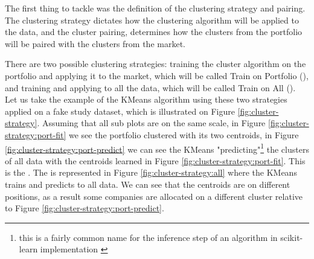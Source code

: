 The first thing to tackle was the definition of the clustering strategy and pairing. The clustering strategy dictates how the clustering algorithm will be applied to the data, and the cluster pairing, determines how the clusters from the portfolio will be paired with the clusters from the market.

There are two possible clustering strategies: training the cluster algorithm on the portfolio and applying it to the market, which will be called Train on Portfolio (\nameClusterStrategyA{}), and training and applying to all the data, which will be called Train on All (\nameClusterStrategyB{}). Let us take the example of the KMeans algorithm using these two strategies applied on a fake study dataset, which is illustrated on Figure \ref{fig:cluster-strategy}. Assuming that all sub plots are on the same scale, in Figure \ref{fig:cluster-strategy:port-fit} we see the portfolio clustered with its two centroids, in Figure \ref{fig:cluster-strategy:port-predict} we can see the KMeans "predicting"\footnote{this is a fairly common name for the inference step of an algorithm in scikit-learn implementation \cite{scikit-learn}} the clusters of all data with the centroids learned in Figure \ref{fig:cluster-strategy:port-fit}. This is the \nameClusterStrategyA{}. The \nameClusterStrategyB{} is represented in Figure \ref{fig:cluster-strategy:all} where the KMeans trains and predicts to all data. We can see that the centroids are on different positions, as a result some companies are allocated on a different cluster relative to Figure \ref{fig:cluster-strategy:port-predict}. 

